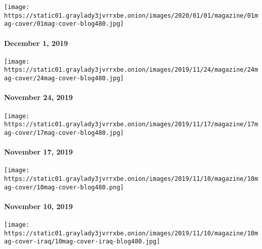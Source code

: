\href{https://www.nytimes3xbfgragh.onion/issue/magazine/2019/12/03/the-12119-issue}{}

\texttt{[image: https://static01.graylady3jvrrxbe.onion/images/2020/01/01/magazine/01mag-cover/01mag-cover-blog480.jpg]}

\hypertarget{december-1-2019}{%
\paragraph{December 1, 2019}\label{december-1-2019}}

\href{https://www.nytimes3xbfgragh.onion/issue/magazine/2019/11/22/the-112419-issue}{}

\texttt{[image: https://static01.graylady3jvrrxbe.onion/images/2019/11/24/magazine/24mag-cover/24mag-cover-blog480.jpg]}

\hypertarget{november-24-2019}{%
\paragraph{November 24, 2019}\label{november-24-2019}}

\href{https://www.nytimes3xbfgragh.onion/issue/magazine/2019/11/15/the-111719-issue}{}

\texttt{[image: https://static01.graylady3jvrrxbe.onion/images/2019/11/17/magazine/17mag-cover/17mag-cover-blog480.jpg]}

\hypertarget{november-17-2019}{%
\paragraph{November 17, 2019}\label{november-17-2019}}

\href{https://www.nytimes3xbfgragh.onion/issue/magazine/2019/11/09/the-111019-issue}{}

\texttt{[image: https://static01.graylady3jvrrxbe.onion/images/2019/11/10/magazine/10mag-cover/10mag-cover-blog480.png]}

\hypertarget{november-10-2019}{%
\paragraph{November 10, 2019}\label{november-10-2019}}

\href{https://www.nytimes3xbfgragh.onion/issue/magazine/2019/11/01/the-11319-issue}{}

\texttt{[image: https://static01.graylady3jvrrxbe.onion/images/2019/11/10/magazine/10mag-cover-iraq/10mag-cover-iraq-blog480.jpg]}

